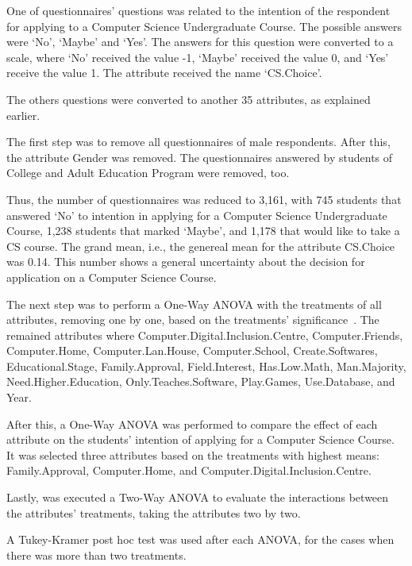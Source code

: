 One of questionnaires' questions was related to the intention of the respondent for applying to a Computer Science Undergraduate Course. The possible answers were `No', `Maybe' and `Yes'. The answers for this question were converted to a scale, where `No' received the value -1, `Maybe' received the value 0, and `Yes' receive the value 1. The attribute received the name `CS.Choice'.

The others questions were converted to another 35 attributes, as explained earlier.

The first step was to remove all questionnaires of male respondents. After this, the attribute Gender was removed. The questionnaires answered by students of College and Adult Education Program were removed, too.

Thus, the number of questionnaires was reduced to 3,161, with 745 students that answered `No' to intention in applying for a Computer Science Undergraduate Course, 1,238 students that marked `Maybe', and 1,178 that would like to take a CS course. The grand mean, i.e., the genereal mean for the attribute CS.Choice was 0.14. This number shows a general uncertainty about the decision for application on a Computer Science Course. 

The next step was to perform a One-Way ANOVA with the treatments of all attributes, removing one by one, based on the treatments' significance~\cite{Chambers1990}. The remained attributes where Computer.Digital.Inclusion.Centre, Computer.Friends, Computer.Home, Computer.Lan.House, Computer.School, Create.Softwares, Educational.Stage, Family.Approval, Field.Interest, Has.Low.Math, Man.Majority, Need.Higher.Education, Only.Teaches.Software, Play.Games, Use.Database, and Year.

After this, a One-Way ANOVA was performed to compare the effect of each attribute on the students' intention of applying for a Computer Science Course. It was selected three attributes based on the treatments with highest means: Family.Approval, Computer.Home, and Computer.Digital.Inclusion.Centre.

Lastly, was executed a Two-Way ANOVA to evaluate the interactions between the attributes' treatments, taking the attributes two by two.   

A Tukey-Kramer post hoc test was used after each ANOVA, for the cases when there was more than two treatments.

